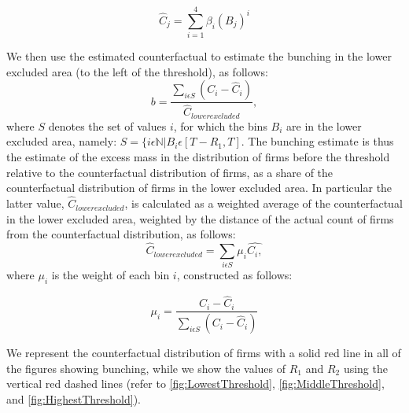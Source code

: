 \begin{equation}
  \label{eq:counterfactual}  
  \hat{C}_{j}=\sum_{i=1}^{4}\beta_{i}(B_{j})^{i}
\end{equation}

We then use the estimated counterfactual to estimate the bunching in the lower excluded area (to the left of the threshold), as follows:
\begin{equation}
  \label{eq:bunching}
  b=\frac{\sum_{i\epsilon S}(C_{i}-\hat{C}_{i})}{\hat{C}_{lowerexcluded}},
\end{equation}
where $S$ denotes the set of values $i$, for which the bins $B_{i}$ are in the lower excluded area, namely: $S=\{i\epsilon\mathbb{N}|B_{i}\epsilon[T-R_{1},T]$. The bunching estimate is thus the estimate of the excess mass in the distribution of firms before the threshold relative to the counterfactual distribution of firms, as a share of the counterfactual distribution of firms in the lower excluded area. In particular the latter value, $\hat{C}_{lowerexcluded}$, is calculated as a weighted average of the counterfactual in the lower excluded area, weighted by the distance of the actual count of firms from the counterfactual distribution, as follows: 
\begin{equation}
  \label{eq:lowerexcluded}
  \hat{C}_{lowerexcluded}=\sum_{i\epsilon S}\mu_{i}\hat{C_{i},}
\end{equation}
where $\mu_{i}$ is the weight of each bin $i$, constructed as follows:

\begin{equation}
  \label{eq:weight}
  \mu_{i}=\frac{C_{i}-\hat{C}_{i}}{\sum_{i\epsilon S}(C_{i}-\hat{C}_{i})}
\end{equation}

We represent the counterfactual distribution of firms with a solid red line in all of the figures showing bunching, while we show the
values of $R_{1}$ and $R_{2}$ using the vertical red dashed lines (refer to \cref{fig:LowestThreshold}, \cref{fig:MiddleThreshold}, and \cref{fig:HighestThreshold}).

